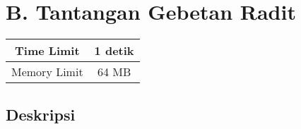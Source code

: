 \documentclass{article}
\begin{document}
\section*{\hfil B. Tantangan Gebetan Radit\hfil}

\begin{center}
\begin{tabular}{ |cc| } 
 \hline
 Time Limit & 1 detik \\ 
 \hline
 Memory Limit & 64 MB \\
 \hline
\end{tabular}
\end{center}

\subsection*{Deskripsi}
\end{document}
